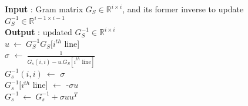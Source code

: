 \documentclass{ipol}
\begin{document}
\begin{algorithm}[H]

\SetLine
\textbf{Input} : Gram matrix $G_S \in \mathbb{R}^{i \times i}$, and its former inverse to update $G_S^{-1}\in \mathbb{R}^{i-1 \times i-1}$\\
\textbf{Output} : updated  $G_S^{-1}\in \mathbb{R}^{i \times i}$\\
$u \ \leftarrow \ G_S^{-1} G_S[i^{th}$ line]\\
$\sigma$ $\leftarrow \ \frac{1}{G_s(i,i) - u.G_S[i^{th} \text{ line}]}$\\
$G_s^{-1}(i,i)\ \leftarrow$ $\sigma$\\
$G_s^{-1}[i^{th}$ line] $\leftarrow$ -$\sigma u$\\
\Return $G_s^{-1} \ \leftarrow \ G_s^{-1}+\sigma u u^T$\\
\caption{Update invert algorithm {\color{red} updateGram} {\color{blue} Marc: Algo correspondant, mais \`a valider.}}

\end{algorithm}
\end{document}
